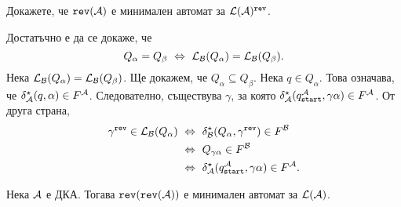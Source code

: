 \begin{problem}
  Докажете, че $\texttt{rev}(\mathcal{A})$ е минимален автомат за $\mathcal{L}(\mathcal{A})^{\texttt{rev}}$.
\end{problem}
\begin{hint}
  Достатъчно е да се докаже, че
  \[Q_\alpha = Q_\beta \ \Leftrightarrow\  \mathcal{L}_{\mathcal{B}}(Q_\alpha) = \mathcal{L}_{\mathcal{B}}(Q_\beta).\]
  Нека $\mathcal{L}_{\mathcal{B}}(Q_\alpha) = \mathcal{L}_{\mathcal{B}}(Q_\beta)$. Ще докажем, че $Q_\alpha \subseteq Q_\beta$.
  Нека $q \in Q_\alpha$. Това означава, че $\delta^\star_{\mathcal{A}}(q,\alpha) \in F^{\mathcal{A}}$.
  Следователно, съществува $\gamma$, за която $\delta^\star_{\mathcal{A}}(q_{\texttt{start}}^{\mathcal{A}},\gamma\alpha) \in F^{\mathcal{A}}$.
  От друга страна,
  \begin{align*}
    \gamma^{\texttt{rev}} \in \mathcal{L}_{\mathcal{B}}(Q_\alpha) & \ \Leftrightarrow\  \delta^\star_{\mathcal{B}}(Q_\alpha,\gamma^{\texttt{rev}}) \in F^{\mathcal{B}}\\
                                    & \ \Leftrightarrow\  Q_{\gamma\alpha} \in F^{\mathcal{B}}\\
                                    & \ \Leftrightarrow\  \delta^\star_{\mathcal{A}}(q_{\texttt{start}}^{\mathcal{A}},\gamma\alpha) \in F^{\mathcal{A}}.
  \end{align*}
\end{hint}


\begin{framed}
  \begin{theorem}[Бжозовски]
    Нека $\mathcal{A}$ е ДКА. Тогава $\texttt{rev}(\texttt{rev}(\mathcal{A}))$ е минимален автомат за $\mathcal{L}(\mathcal{A})$.
  \end{theorem}
\end{framed}



